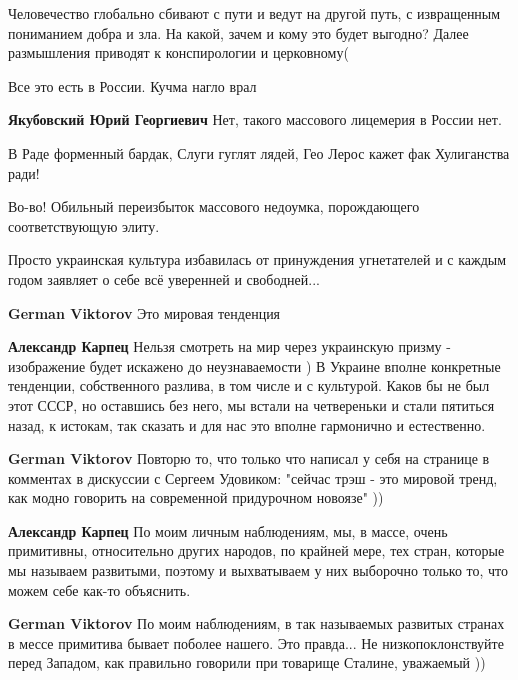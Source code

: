 \begin{itemize}
Человечество глобально сбивают с пути и ведут на другой путь, с извращенным
пониманием добра и зла. На какой, зачем и кому это будет выгодно? Далее
размышления приводят к конспирологии и церковному(


Все это есть в России. Кучма нагло врал

\begin{itemize} %
\textbf{Якубовский Юрий Георгиевич} Нет, такого массового лицемерия в России нет.
\end{itemize} %


\obeycr
В Раде форменный бардак,
Слуги гуглят лядей,
Гео Лерос кажет фак
Хулиганства ради!
\restorecr

Во-во! Обильный переизбыток массового недоумка, порождающего соответствующую элиту.

Просто украинская культура избавилась от принуждения угнетателей и с каждым годом заявляет о себе всё уверенней и свободней...

\begin{itemize} %
\textbf{German Viktorov} Это мировая тенденция

\textbf{Александр Карпец} Нельзя смотреть на мир через украинскую призму - изображение будет искажено до неузнаваемости ) В Украине вполне конкретные тенденции, собственного разлива, в том числе и с культурой. Каков бы не был этот СССР, но оставшись без него, мы встали на четвереньки и стали пятиться назад, к истокам, так сказать и для нас это вполне гармонично и естественно.

\textbf{German Viktorov} Повторю то, что только что написал у себя на странице в комментах в дискуссии с Сергеем Удовиком:
"сейчас трэш - это мировой тренд, как модно говорить на современной придурочном новоязе" ))

\textbf{Александр Карпец} По моим личным наблюдениям, мы, в массе, очень примитивны, относительно других народов, по крайней мере, тех стран, которые мы называем развитыми, поэтому и выхватываем у них выборочно только то, что можем себе как-то объяснить.

\textbf{German Viktorov} По моим наблюдениям, в так называемых развитых странах в мессе примитива бывает поболее нашего. Это правда...
Не низкопоклонствуйте перед Западом, как правильно говорили при товарище Сталине, уважаемый ))


\end{itemize}
\end{itemize}
